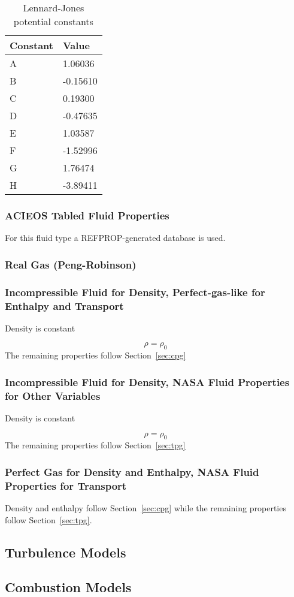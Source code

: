 \begin{table}[H]
	\centering
	\begin{tabular}{ll}
		\toprule
		Constant & Value \\
		\midrule
		A & 1.06036 \\
		B & -0.15610 \\
		C & 0.19300 \\
		D & -0.47635 \\
		E & 1.03587 \\
		F & -1.52996 \\
		G & 1.76474 \\
		H & -3.89411 \\
		\bottomrule
	\end{tabular}
	\caption{Lennard-Jones potential constants}
	\label{tab:lj_constants}
\end{table}

\subsubsection{ACIEOS Tabled Fluid Properties}

For this fluid type a REFPROP-generated database is used.

\subsubsection{Real Gas (Peng-Robinson)}

\subsubsection{Incompressible Fluid for Density, Perfect-gas-like for Enthalpy and Transport}

Density is constant

\begin{equation}
	\rho = \rho_0
\end{equation}
The remaining properties follow Section~\ref{sec:cpg}


\subsubsection{Incompressible Fluid for Density, NASA Fluid Properties for
Other Variables}

Density is constant

\begin{equation}
	\rho = \rho_0
\end{equation}
The remaining properties follow Section~\ref{sec:tpg}

\subsubsection{Perfect Gas for Density and Enthalpy, NASA Fluid Properties for Transport}

Density and enthalpy follow Section~\ref{sec:cpg} while the remaining properties follow Section~\ref{sec:tpg}.

\subsection{Turbulence Models}

\subsection{Combustion Models}